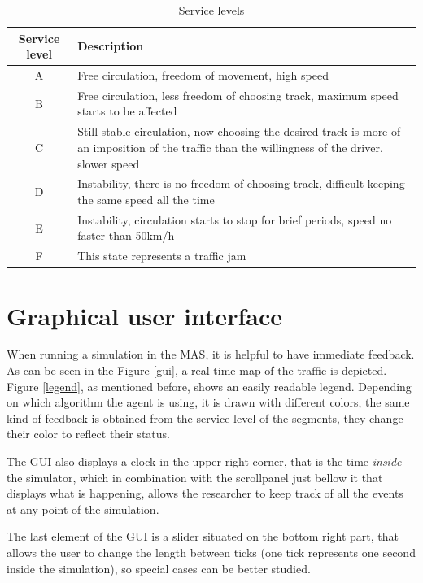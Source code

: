 \begin{table}
\begin{tabularx}{\textwidth}{|c|X|}
\hline 
\textbf{Service level} & \textbf{Description} \\ 
\hline 
A & Free circulation, freedom of movement, high speed \\ 
\hline 
B & Free circulation, less freedom of choosing track, maximum speed starts to be affected \\ 
\hline 
C & Still stable circulation, now choosing the desired track is more of an imposition of the traffic than the willingness of the driver, slower speed \\ 
\hline 
D & Instability, there is no freedom of choosing track, difficult keeping the same speed all the time \\ 
\hline 
E & Instability, circulation starts to stop for brief periods, speed no faster than 50km/h \\ 
\hline 
F & This state represents a traffic jam \\ 
\hline 
\end{tabularx}
\caption{Service levels}
\label{serviceLevels}
\end{table}

\section{Graphical user interface}

When running a simulation in the MAS, it is helpful to have immediate feedback. As can be seen in the Figure \ref{gui}, a real time map of the traffic is depicted. Figure \ref{legend}, as mentioned before, shows an easily readable legend. Depending on which algorithm the agent is using, it is drawn with different colors, the same kind of feedback is obtained from the service level of the segments, they change their color to reflect their status.

The GUI also displays a clock in the upper right corner, that is the time \textit{inside} the simulator, which in combination with the scrollpanel just bellow it that displays what is happening, allows the researcher to keep track of all the events at any point of the simulation.

The last element of the GUI is a slider situated on the bottom right part, that allows the user to change the length between ticks (one tick represents one second inside the simulation), so special cases can be better studied.


